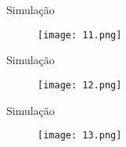 \begin{frame}{Simulação}

  \begin{figure}[ht]
    \begin{minipage}[b]{0.35\linewidth}
      \centering
      \texttt{[image: 11.png]}
    \end{minipage}

  \end{figure}

\end{frame}

\begin{frame}{Simulação}

  \begin{figure}[ht]
    \begin{minipage}[b]{0.35\linewidth}
      \centering
      \texttt{[image: 12.png]}
    \end{minipage}

  \end{figure}

\end{frame}

\begin{frame}{Simulação}

  \begin{figure}[ht]
    \begin{minipage}[b]{0.35\linewidth}
      \centering
      \texttt{[image: 13.png]}
    \end{minipage}

  \end{figure}

\end{frame}